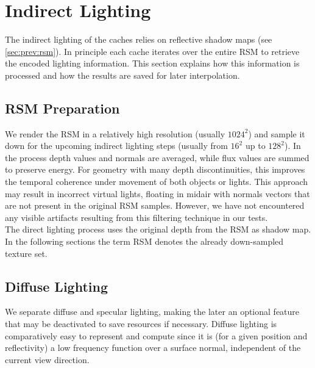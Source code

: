 \documentclass[thesis.tex]{subfiles}
\begin{document}
\section{Indirect Lighting}
The indirect lighting of the caches relies on reflective shadow maps (see \autoref{sec:prev:rsm}).
In principle each cache iterates over the entire RSM to retrieve the encoded lighting information.
This section explains how this information is processed and how the results are saved for later interpolation.

\subsection{RSM Preparation} \label{sec:impl:rsmprep}
We render the RSM in a relatively high resolution (usually $1024^2$) and sample it down for the upcoming indirect lighting steps (usually from $16^2$ up to $128^2$).
In the process depth values and normals are averaged, while flux values are summed to preserve energy.
For geometry with many depth discontinuities, this improves the temporal coherence under movement of both objects or lights.
This approach may result in incorrect virtual lights, floating in midair with normals vectors that are not present in the original RSM samples.
However, we have not encountered any visible artifacts resulting from this filtering technique in our tests.
\\
The direct lighting process uses the original depth from the RSM as shadow map.
In the following sections the term RSM denotes the already down-sampled texture set.

\subsection{Diffuse Lighting} \label{sec:impl:diffuse}
We separate diffuse and specular lighting, making the later an optional feature that may be deactivated to save resources if necessary.
Diffuse lighting is comparatively easy to represent and compute since it is (for a given position and reflectivity) a low frequency function over a surface normal, independent of the current view direction.

\end{document}
